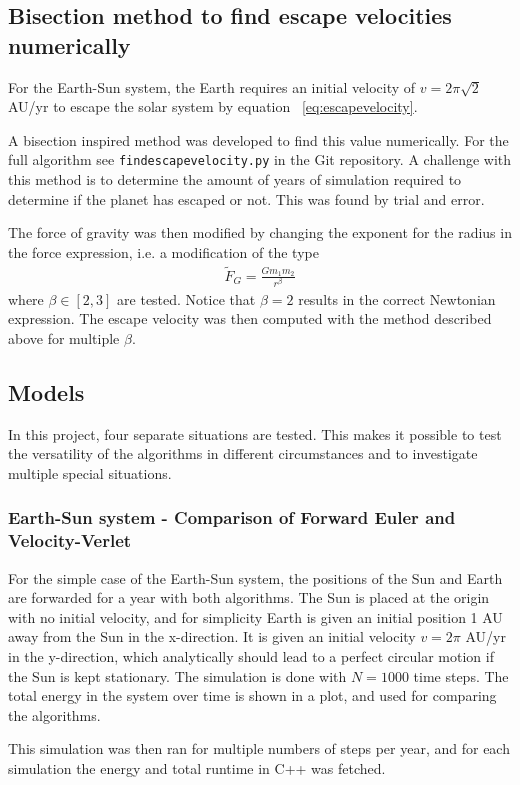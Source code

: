 \documentclass[aps,reprint]{revtex4-1}
\begin{document}
\subsection{Bisection method to find escape velocities numerically}
For the Earth-Sun system, the Earth requires an initial velocity of
$v = 2 \pi \sqrt{2}$ AU/yr to escape the solar system by equation ~\ref{eq:escapevelocity}.

A bisection inspired method was developed to find this value numerically. For the
full algorithm see \texttt{findescapevelocity.py} in the Git repository. A challenge
with this method is to determine the amount of years of simulation required to
determine if the planet has escaped or not. This was found by trial and error.

The force of gravity was then modified by changing the exponent for the radius
in the force expression, i.e. a modification of the type
\begin{align*}
  \tilde{F}_G = \frac{G m_1 m_2}{r^\beta}
\end{align*}
where $\beta \in [2,3]$ are tested. Notice that $\beta = 2$ results in the correct
Newtonian expression. The escape velocity was then computed with the method
described above for multiple $\beta$.

\subsection{Models}
In this project, four separate situations are tested. This makes it possible to test the versatility of the
algorithms in different circumstances and to investigate multiple special situations.
\subsubsection{Earth-Sun system - Comparison of Forward Euler and Velocity-Verlet}
\label{seq:earthsunmethod}
For the simple case of the Earth-Sun system, the positions of the Sun and Earth are
forwarded for a year with both algorithms. The Sun is placed at the origin with
no initial velocity, and for simplicity Earth is given an initial position 1 AU
away from the Sun in the x-direction. It is given an initial velocity $v = 2\pi$ AU/yr
in the y-direction, which analytically should lead to a perfect circular motion
if the Sun is kept stationary. The simulation is done with $N = 1000$ time steps.
The total energy in the system over time is shown in a plot, and used for
comparing the algorithms.

This simulation was then ran for multiple numbers of steps per year, and for
each simulation the energy and total runtime in C++ was fetched.
\end{document}
